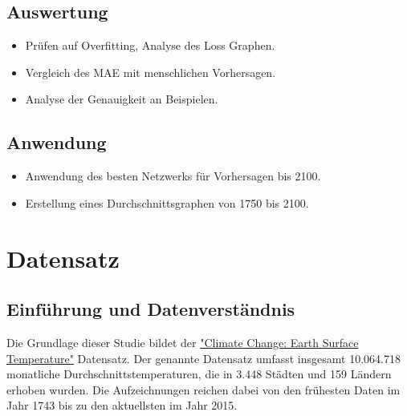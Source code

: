 \documentclass[manuscript,screen,review]{acmart}
\begin{document}
\subsection*{Auswertung}
\begin{itemize}
    \item Prüfen auf Overfitting, Analyse des Loss Graphen.
    \item Vergleich des MAE mit menschlichen Vorhersagen.
    \item Analyse der Genauigkeit an Beispielen.
\end{itemize}

\subsection*{Anwendung}
\begin{itemize}
    \item Anwendung des besten Netzwerks für Vorhersagen bis 2100.
    \item Erstellung eines Durchschnittsgraphen von 1750 bis 2100.
\end{itemize}



\section{Datensatz}
\subsection{Einführung und Datenverständnis}
Die Grundlage dieser Studie bildet der \href{https://www.kaggle.com/datasets/berkeleyearth/climate-change-earth-surface-temperature-data?select=GlobalLandTemperaturesByCity.csv}{"Climate Change: Earth Surface Temperature"} Datensatz.
Der genannte Datensatz umfasst insgesamt 10.064.718 monatliche Durchschnittstemperaturen, die in 3.448 Städten und 159 Ländern erhoben wurden. Die Aufzeichnungen reichen dabei von den frühesten Daten im Jahr 1743 bis zu den aktuellsten im Jahr 2015.
\end{document}
